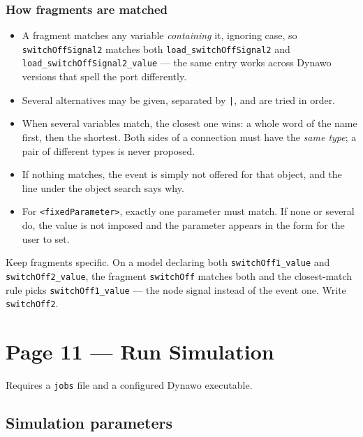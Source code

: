 \documentclass[a4paper,11pt]{article}
\newcommand{\code}[1]{\texttt{\small #1}}
\newcommand{\ftype}[1]{\texttt{\small\color{rteblu}#1}}
\begin{document}
\subsubsection*{How fragments are matched}

\begin{itemize}[leftmargin=2em]
  \item A fragment matches any variable \emph{containing} it, ignoring case, so
    \code{switchOffSignal2} matches both \code{load\_switchOffSignal2} and
    \code{load\_switchOffSignal2\_value} --- the same entry works across Dynawo
    versions that spell the port differently.
  \item Several alternatives may be given, separated by \code{|}, and are tried
    in order.
  \item When several variables match, the closest one wins: a whole word of the
    name first, then the shortest. Both sides of a connection must have the
    \emph{same type}; a pair of different types is never proposed.
  \item If nothing matches, the event is simply not offered for that object,
    and the line under the object search says why.
  \item For \code{<fixedParameter>}, exactly one parameter must match. If none
    or several do, the value is not imposed and the parameter appears in the
    form for the user to set.
\end{itemize}

\begin{warnbox}
Keep fragments specific. On a model declaring both \code{switchOff1\_value} and
\code{switchOff2\_value}, the fragment \code{switchOff} matches both and the
closest-match rule picks \code{switchOff1\_value} --- the node signal instead of
the event one. Write \code{switchOff2}.
\end{warnbox}

\section{Page 11 --- Run Simulation}
\label{sec:runsim}

Requires a \ftype{jobs} file and a configured Dynawo executable.

\subsection{Simulation parameters}
\end{document}
